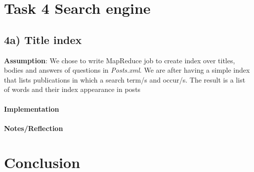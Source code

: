 \documentclass[fleqn,10pt]{wlscirep}
\begin{document}
\section*{Task 4 Search engine}
\subsection*{4a) Title index}
\textbf{Assumption}: We chose to write MapReduce job to create index over titles, bodies and answers of questions in \textit{Posts.xml}. We are after having a simple index that lists publications in which a search term/s and occur/s. The result is a list of words and their index appearance in posts \\ \\
\textbf{Implementation}  \\ \\
\textbf{Notes/Reflection}


\section*{Conclusion}
\end{document}

